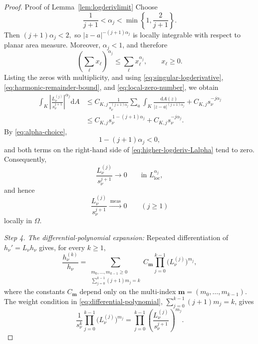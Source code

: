 \documentclass[12pt,letterpaper,reqno]{amsart}
\theoremstyle{definition}
\numberwithin{equation}{section}
\newcommand{\loc}{\mathrm{loc}}
\newcommand{\convmeas}{\xrightarrow{\,\mathrm{meas}\,}}
\begin{document}
\begin{proof}{Proof of Lemma~\ref{lem:logderivlimit}}
Choose
\begin{equation}\label{eq:alpha-choice}
 \frac1{j+1}
 <
 \alpha_j
 <
 \min\left\{1,\frac2{j+1}\right\}.
\end{equation}
Then
$
(j+1)\alpha_j<2,
$
so
$
|z-a|^{-(j+1)\alpha_j}
$
is locally integrable with respect to planar area measure. Moreover,
\(\alpha_j<1\), and therefore
\[
\left(\sum_\ell x_\ell\right)^{\alpha_j}
\leq
\sum_\ell x_\ell^{\alpha_j},
\qquad x_\ell\geq0.
\]
Listing the zeros with multiplicity, and using
\eqref{eq:singular-logderivative},
\eqref{eq:harmonic-remainder-bound}, and
\eqref{eq:local-zero-number}, we obtain
\begin{equation}\label{eq:higher-logderiv-Lalpha}
\begin{aligned}
 \int_K
 \left|
 \frac{L_\nu^{(j)}}{s_\nu^{j+1}}
 \right|^{\alpha_j}\mathrm dA
 &\leq
 C_{K,j}
 \frac1{s_\nu^{(j+1)\alpha_j}}
 \sum_a
 \int_K
 \frac{\mathrm dA(z)}
 {|z-a|^{(j+1)\alpha_j}}
 +C_{K,j}s_\nu^{-j\alpha_j}
 \\
 &\leq
 C_{K,j}s_\nu^{\,1-(j+1)\alpha_j}
 +C_{K,j}s_\nu^{-j\alpha_j}.
\end{aligned}
\end{equation}
By \eqref{eq:alpha-choice},
\[
1-(j+1)\alpha_j<0,
\]
and both terms on the right-hand side of
\eqref{eq:higher-logderiv-Lalpha} tend to zero. Consequently,
\[
\frac{L_\nu^{(j)}}{s_\nu^{j+1}}
\longrightarrow0
\qquad\text{in }L^{\alpha_j}_{\loc},
\]
and hence
\begin{equation}\label{eq:higher-logderiv-measure}
 \frac{L_\nu^{(j)}}{s_\nu^{j+1}}
 \convmeas0
 \qquad(j\geq1)
\end{equation}
locally in \(\Omega\).

\medskip\noindent
\emph{{Step 4. The differential-polynomial expansion:}}
Repeated differentiation of
$
h_\nu'=L_\nu h_\nu
$
gives, for every \(k\geq1\),
\begin{equation}\label{eq:differential-polynomial}
 \frac{h_\nu^{(k)}}{h_\nu}
 =
 \sum_{\substack{m_0,\ldots,m_{k-1}\ge0\\
                  \sum_{j=0}^{k-1}(j+1)m_j=k}}
 C_{\mathbf m}
 \prod_{j=0}^{k-1}
 \bigl(L_\nu^{(j)}\bigr)^{m_j},
\end{equation}
where the constants \(C_{\mathbf m}\) depend only on the multi-index
$
\mathbf m=(m_0,\ldots,m_{k-1}).
$
The weight condition in \eqref{eq:differential-polynomial},
\(\sum_{j=0}^{k-1}(j+1)m_j=k\), gives
\begin{equation}\label{eq:normalized-monomial}
 \frac1{s_\nu^k}
 \prod_{j=0}^{k-1}
 \bigl(L_\nu^{(j)}\bigr)^{m_j}
 =
 \prod_{j=0}^{k-1}
 \left(
 \frac{L_\nu^{(j)}}{s_\nu^{j+1}}
 \right)^{m_j}.
\end{equation}


\end{proof}
\end{document}
